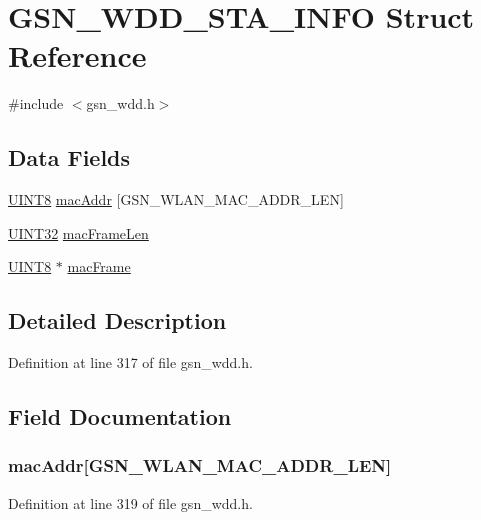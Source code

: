 \hypertarget{a00299}{
\section{GSN\_\-WDD\_\-STA\_\-INFO Struct Reference}
\label{a00299}
}


{\ttfamily \#include $<$gsn\_\-wdd.h$>$}

\subsection*{Data Fields}
\begin{DoxyCompactItemize}
\item 
\hyperlink{a00660_gab27e9918b538ce9d8ca692479b375b6a}{UINT8} \hyperlink{a00299_ae2a041fcbc5c6b029dc55fde7c0aeeb2}{macAddr} \mbox{[}GSN\_\-WLAN\_\-MAC\_\-ADDR\_\-LEN\mbox{]}
\item 
\hyperlink{a00660_gae1e6edbbc26d6fbc71a90190d0266018}{UINT32} \hyperlink{a00299_a497cc4340dcfaffcd97deb95bdd56b9f}{macFrameLen}
\item 
\hyperlink{a00660_gab27e9918b538ce9d8ca692479b375b6a}{UINT8} $\ast$ \hyperlink{a00299_a98ed85cf798d5666f0316ef976962cd1}{macFrame}
\end{DoxyCompactItemize}


\subsection{Detailed Description}


Definition at line 317 of file gsn\_\-wdd.h.



\subsection{Field Documentation}
\hypertarget{a00299_ae2a041fcbc5c6b029dc55fde7c0aeeb2}{
\subsubsection[{macAddr}]{ {\bf macAddr}\mbox{[}GSN\_\-WLAN\_\-MAC\_\-ADDR\_\-LEN\mbox{]}}}
\label{a00299_ae2a041fcbc5c6b029dc55fde7c0aeeb2}


Definition at line 319 of file gsn\_\-wdd.h.

